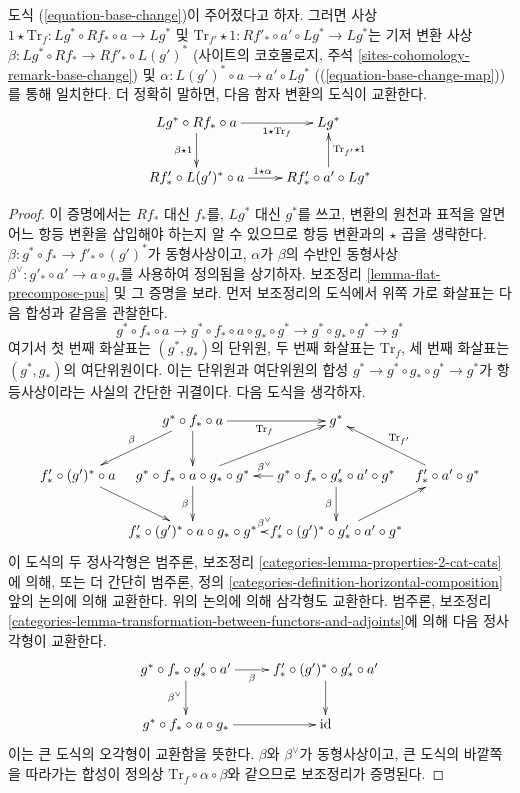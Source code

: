 \begin{lemma}
\label{lemma-trace-map-and-base-change}
도식 (\ref{equation-base-change})이 주어졌다고 하자. 그러면 사상
$1 \star \text{Tr}_f : Lg^* \circ Rf_* \circ a \to Lg^*$ 및
$\text{Tr}_{f'} \star 1 : Rf'_* \circ a' \circ Lg^* \to Lg^*$는
기저 변환 사상
$\beta : Lg^* \circ Rf_* \to Rf'_* \circ L(g')^*$
(사이트의 코호몰로지, 주석
\ref{sites-cohomology-remark-base-change}) 및
$\alpha : L(g')^* \circ a \to a' \circ Lg^*$
((\ref{equation-base-change-map}))를 통해 일치한다.
더 정확히 말하면, 다음 함자 변환의 도식이 교환한다.
$$
\xymatrix{
Lg^* \circ Rf_* \circ a
\ar[d]_{\beta \star 1} \ar[r]_-{1 \star \text{Tr}_f} &
Lg^* \\
Rf'_* \circ L(g')^* \circ a \ar[r]^{1 \star \alpha} &
Rf'_* \circ a' \circ Lg^* \ar[u]_{\text{Tr}_{f'} \star 1}
}
$$
\end{lemma}

\begin{proof}
이 증명에서는 $Rf_*$ 대신 $f_*$를, $Lg^*$ 대신 $g^*$를 쓰고,
변환의 원천과 표적을 알면 어느 항등 변환을 삽입해야 하는지 알 수
있으므로 항등 변환과의 $\star$ 곱을 생략한다.
$\beta : g^* \circ f_* \to f'_* \circ (g')^*$가 동형사상이고,
$\alpha$가 $\beta$의 수반인 동형사상
$\beta^\vee : g'_* \circ a' \to a \circ g_*$를 사용하여 정의됨을
상기하자. 보조정리 \ref{lemma-flat-precompose-pus} 및 그 증명을 보라.
먼저 보조정리의 도식에서 위쪽 가로 화살표는 다음 합성과 같음을
관찰한다.
$$
g^* \circ f_* \circ a \to
g^* \circ f_* \circ a \circ g_* \circ g^* \to
g^* \circ g_* \circ g^* \to g^*
$$
여기서 첫 번째 화살표는 $(g^*, g_*)$의 단위원, 두 번째 화살표는
$\text{Tr}_f$, 세 번째 화살표는 $(g^*, g_*)$의 여단위원이다.
이는 단위원과 여단위원의 합성
$g^* \to g^* \circ g_* \circ g^* \to g^*$가 항등사상이라는 사실의
간단한 귀결이다. 다음 도식을 생각하자.
$$
\xymatrix@C=.3em{
& g^* \circ f_* \circ a \ar[ld]_\beta \ar[d] \ar[r]_{\text{Tr}_f} & g^* \\
f'_* \circ (g')^* \circ a \ar[dr] &
g^* \circ f_* \circ a \circ g_* \circ g^* \ar[d]_\beta \ar[ru] &
g^* \circ f_* \circ g'_* \circ a' \circ g^* \ar[l]_{\beta^\vee} \ar[d]_\beta &
f'_* \circ a' \circ g^* \ar[lu]_{\text{Tr}_{f'}} \\
& f'_* \circ (g')^* \circ a \circ g_* \circ g^* &
f'_* \circ (g')^* \circ g'_* \circ a' \circ g^* \ar[ru] \ar[l]_{\beta^\vee}
}
$$
이 도식의 두 정사각형은 범주론, 보조정리
\ref{categories-lemma-properties-2-cat-cats}에 의해, 또는 더 간단히
범주론, 정의 \ref{categories-definition-horizontal-composition} 앞의
논의에 의해 교환한다. 위의 논의에 의해 삼각형도 교환한다.
범주론, 보조정리
\ref{categories-lemma-transformation-between-functors-and-adjoints}에
의해 다음 정사각형이 교환한다.
$$
\xymatrix{
g^* \circ f_* \circ g'_* \circ a' \ar[d]_{\beta^\vee} \ar[r]_-\beta &
f'_* \circ (g')^* \circ g'_* \circ a' \ar[d] \\
g^* \circ f_* \circ a \circ g_* \ar[r] &
\text{id}
}
$$
이는 큰 도식의 오각형이 교환함을 뜻한다. $\beta$와 $\beta^\vee$가
동형사상이고, 큰 도식의 바깥쪽을 따라가는 합성이 정의상
$\text{Tr}_f \circ \alpha \circ \beta$와 같으므로 보조정리가 증명된다.
\end{proof}

